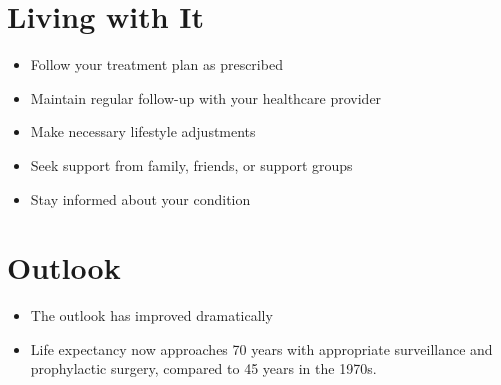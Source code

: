 \section{Living with It}
\begin{itemize}[noitemsep]
  \item Follow your treatment plan as prescribed
  \item Maintain regular follow-up with your healthcare provider
  \item Make necessary lifestyle adjustments
  \item Seek support from family, friends, or support groups
  \item Stay informed about your condition
\end{itemize}
\section{Outlook}
\begin{itemize}[noitemsep]
  \item The outlook has improved dramatically
  \item Life expectancy now approaches 70 years with appropriate surveillance and prophylactic surgery, compared to 45 years in the 1970s.
\end{itemize}
